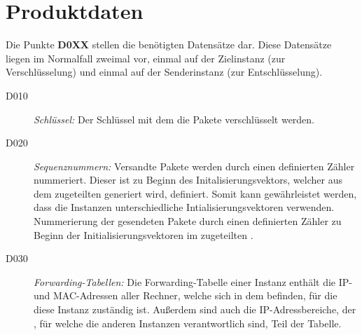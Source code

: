 \section{Produktdaten}

Die Punkte \textbf{D0XX} stellen die benötigten Datensätze dar. 
Diese Datensätze liegen im Normalfall zweimal vor, einmal auf der Zielinstanz (zur Verschlüsselung) und einmal auf der Senderinstanz (zur Entschlüsselung).
\begin{description}
  \item[D010]\textit{Schlüssel:} Der Schlüssel mit dem die Pakete verschlüsselt werden.
  \item[D020]\textit{Sequenznummern:} Versandte Pakete werden durch einen definierten Zähler nummeriert.
  Dieser ist zu Beginn des Initalisierungsvektors, welcher aus dem zugeteilten  generiert wird, definiert. 
  Somit kann gewährleistet werden, dass die Instanzen unterschiedliche Intialisierungsvektoren verwenden.
  Nummerierung der gesendeten Pakete durch einen definierten Zähler zu Beginn der Initialisierungsvektoren im zugeteilten .
  \item[D030]\textit{Forwarding-Tabellen:} Die Forwarding-Tabelle einer Instanz enthält die IP- und MAC-Adressen aller Rechner, welche sich in dem  befinden, für die diese Instanz zuständig ist. 
  Außerdem sind auch die IP-Adressbereiche, der , für welche die anderen Instanzen verantwortlich sind, Teil der Tabelle.
  
\end{description}